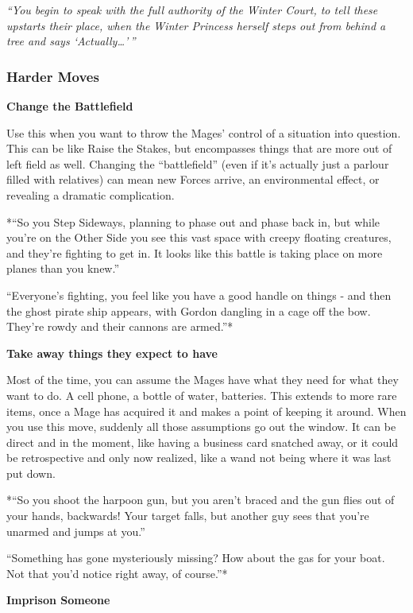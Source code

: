 \documentclass[
]{article}
\begin{document}
\emph{``You begin to speak with the full authority of the Winter Court,
to tell these upstarts their place, when the Winter Princess herself
steps out from behind a tree and says `Actually\ldots{}'\,''}

\hypertarget{harder-moves}{%
\subsubsection{Harder Moves}\label{harder-moves}}

\textbf{Change the Battlefield}

Use this when you want to throw the Mages' control of a situation into
question. This can be like Raise the Stakes, but encompasses things that
are more out of left field as well. Changing the ``battlefield'' (even
if it's actually just a parlour filled with relatives) can mean new
Forces arrive, an environmental effect, or revealing a dramatic
complication.

*``So you Step Sideways, planning to phase out and phase back in, but
while you're on the Other Side you see this vast space with creepy
floating creatures, and they're fighting to get in. It looks like this
battle is taking place on more planes than you knew.''

``Everyone's fighting, you feel like you have a good handle on things -
and then the ghost pirate ship appears, with Gordon dangling in a cage
off the bow. They're rowdy and their cannons are armed.''*

\textbf{Take away things they expect to have}

Most of the time, you can assume the Mages have what they need for what
they want to do. A cell phone, a bottle of water, batteries. This
extends to more rare items, once a Mage has acquired it and makes a
point of keeping it around. When you use this move, suddenly all those
assumptions go out the window. It can be direct and in the moment, like
having a business card snatched away, or it could be retrospective and
only now realized, like a wand not being where it was last put down.

*``So you shoot the harpoon gun, but you aren't braced and the gun flies
out of your hands, backwards! Your target falls, but another guy sees
that you're unarmed and jumps at you.''

``Something has gone mysteriously missing? How about the gas for your
boat. Not that you'd notice right away, of course.''*

\textbf{Imprison Someone}
\end{document}
